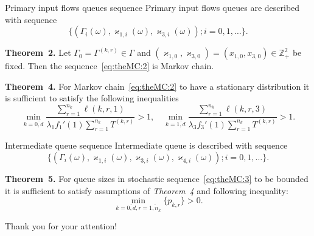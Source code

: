 \documentclass[10pt]{beamer}
\begin{document}
\begin{frame}{Primary input flows queues sequence}
Primary input flows queues are described with sequence
\begin{equation}
\label{eq:theMC:2}
\{(\Gamma_i(\omega), \varkappa_{1,i}(\omega),\varkappa_{3,i}(\omega)); i =0, 1, \ldots\}.
\end{equation}
\vfill
\begin{block}{\bf Theorem~2.}
 Let $\Gamma_0=\Gamma^{(k,r)}\in \Gamma$ and $(\varkappa_{1,0}, \varkappa_{3,0})=(x_{1,0}, x_{3,0})\in \mathbb{Z}_+^2$ be fixed. Then the sequence~\eqref{eq:theMC:2} is Markov chain.
\end{block}
\begin{block}{\bf Theorem~4.}
For Markov chain~\eqref{eq:theMC:2} to have a stationary distribution it is sufficient to satisfy the following inequalities
\begin{equation*}
\min_{k=\overline{0,d}} { \frac{\sum_{r = 1}^{n_k} \ell(k,r,1) }{\lambda_1 f_1'(1) \sum_{r=1}^{n_k} T^{(k,r)} }}>1, \quad 
\min_{k=\overline{1,d}} { \frac{\sum_{r = 1}^{n_k} \ell(k,r,3) }{\lambda_3 f_3'(1) \sum_{r=1}^{n_k} T^{(k,r)} }}>1.
\label{sufficient:double}
\end{equation*}
\end{block}
\end{frame}


\begin{frame}{Intermediate queue sequence}
Intermediate queue is described with sequence
\begin{equation}
\label{eq:theMC:3}
\{(\Gamma_i(\omega), \varkappa_{1,i}(\omega),\varkappa_{3,i}(\omega),\varkappa_{4,i}(\omega)); i =0, 1, \ldots\}.
\end{equation}
\vfill
\begin{block}{\bf Theorem~5.}
For queue sizes in stochastic sequence~\eqref{eq:theMC:3} to be bounded it is sufficient to satisfy assumptions of \textit{Theorem~4} and following inequality:
\begin{equation*}
    \min_{k=\overline{0,d}, r=\overline{1,n_k}} {\{p_{k,r}\}} > 0.
\end{equation*}
\end{block}


\end{frame}





\begin{frame}
\Huge{\centerline{\color{blue} Thank you for your attention!}}
\end{frame}
\end{document}
